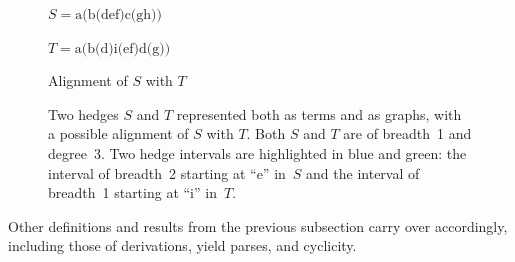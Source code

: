 \begin{figure}[t]
\begin{minipage}[b]{.4\textwidth}
    \end{minipage}

    \vspace{.2ex}
    \begin{minipage}[b]{.3\textwidth}\centering\small
        \(S = \text{a(b(def)c(gh))}\)
    \end{minipage}%
    \begin{minipage}[b]{.3\textwidth}\centering\small
        \(T = \text{a(b(d)i(ef)d(g))}\)
    \end{minipage}%
    \begin{minipage}[b]{.4\textwidth}\centering\small
        Alignment of \(S\) with \(T\)
    \end{minipage}
    
    \caption[Examples of hedges and their alignment]{
        Two hedges \(S\) and \(T\) represented both as terms and as graphs, with a possible alignment of \(S\) with \(T\).
        Both \(S\) and \(T\) are of breadth~1 and degree~3.
        Two hedge intervals are highlighted in blue and green:
        the interval of breadth~2 starting at \enquote{e} in~\(S\)
        and the interval of breadth~1 starting at \enquote{i} in~\(T\).
        \label{fig:hedges}
    }
\end{figure}

Other definitions and results from the previous subsection carry over accordingly, including those of derivations, yield parses, and cyclicity.

